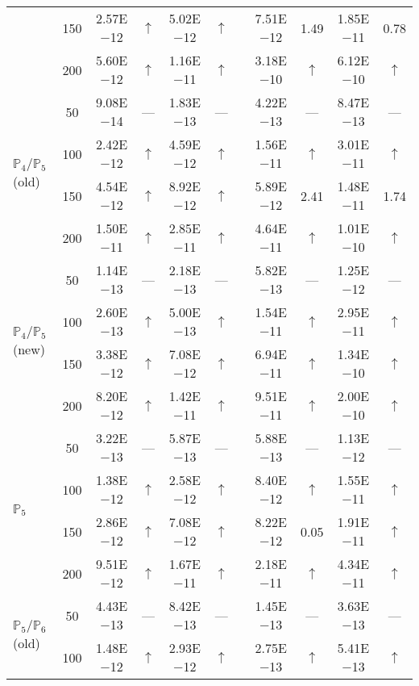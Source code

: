 \begin{table}[H]
{\begin{tabular}{@{}l c c c c c c c c c c@{}}
 & 150 & 2.57E$-$12 & $\uparrow$  & 5.02E$-$12 & $\uparrow$ &  & 7.51E$-$12 & 1.49 & 1.85E$-$11 & 0.78\\
 & 200 & 5.60E$-$12 & $\uparrow$  & 1.16E$-$11 & $\uparrow$ &  & 3.18E$-$10 & $\uparrow$ & 6.12E$-$10 & $\uparrow$\\
\midrule
\multirow{4}{*}{$\mathbb{P}_{4}/\mathbb{P}_{5}$ (old)}
 & 50 & 9.08E$-$14 & ---  & 1.83E$-$13 & --- &  & 4.22E$-$13 & --- & 8.47E$-$13 & ---\\
 & 100 & 2.42E$-$12 & $\uparrow$  & 4.59E$-$12 & $\uparrow$ &  & 1.56E$-$11 & $\uparrow$ & 3.01E$-$11 & $\uparrow$\\
 & 150 & 4.54E$-$12 & $\uparrow$  & 8.92E$-$12 & $\uparrow$ &  & 5.89E$-$12 & 2.41 & 1.48E$-$11 & 1.74\\
 & 200 & 1.50E$-$11 & $\uparrow$  & 2.85E$-$11 & $\uparrow$ &  & 4.64E$-$11 & $\uparrow$ & 1.01E$-$10 & $\uparrow$\\
\midrule
\multirow{4}{*}{$\mathbb{P}_{4}/\mathbb{P}_{5}$ (new)}
 & 50 & 1.14E$-$13 & ---  & 2.18E$-$13 & --- &  & 5.82E$-$13 & --- & 1.25E$-$12 & ---\\
 & 100 & 2.60E$-$13 & $\uparrow$  & 5.00E$-$13 & $\uparrow$ &  & 1.54E$-$11 & $\uparrow$ & 2.95E$-$11 & $\uparrow$\\
 & 150 & 3.38E$-$12 & $\uparrow$  & 7.08E$-$12 & $\uparrow$ &  & 6.94E$-$11 & $\uparrow$ & 1.34E$-$10 & $\uparrow$\\
 & 200 & 8.20E$-$12 & $\uparrow$  & 1.42E$-$11 & $\uparrow$ &  & 9.51E$-$11 & $\uparrow$ & 2.00E$-$10 & $\uparrow$\\
\midrule
\multirow{4}{*}{$\mathbb{P}_{5}$}
 & 50 & 3.22E$-$13 & ---  & 5.87E$-$13 & --- &  & 5.88E$-$13 & --- & 1.13E$-$12 & ---\\
 & 100 & 1.38E$-$12 & $\uparrow$  & 2.58E$-$12 & $\uparrow$ &  & 8.40E$-$12 & $\uparrow$ & 1.55E$-$11 & $\uparrow$\\
 & 150 & 2.86E$-$12 & $\uparrow$  & 7.08E$-$12 & $\uparrow$ &  & 8.22E$-$12 & 0.05 & 1.91E$-$11 & $\uparrow$\\
 & 200 & 9.51E$-$12 & $\uparrow$  & 1.67E$-$11 & $\uparrow$ &  & 2.18E$-$11 & $\uparrow$ & 4.34E$-$11 & $\uparrow$\\
\midrule
\multirow{4}{*}{$\mathbb{P}_{5}/\mathbb{P}_{6}$ (old)}
 & 50 & 4.43E$-$13 & ---  & 8.42E$-$13 & --- &  & 1.45E$-$13 & --- & 3.63E$-$13 & ---\\
 & 100 & 1.48E$-$12 & $\uparrow$  & 2.93E$-$12 & $\uparrow$ &  & 2.75E$-$13 & $\uparrow$ & 5.41E$-$13 & $\uparrow$\\

\end{tabular}}
\end{table}
